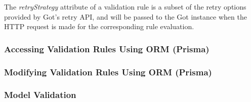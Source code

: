   The \emph{retryStrategy} attribute of a validation rule is a subset of the retry options provided by Got's retry API, and will be passed to the Got instance when the HTTP request is made for the corresponding rule evaluation. 

 \subsubsection{Accessing Validation Rules Using ORM (Prisma)} 

 \subsubsection{Modifying Validation Rules Using ORM (Prisma)}

 \subsubsection{Model Validation}